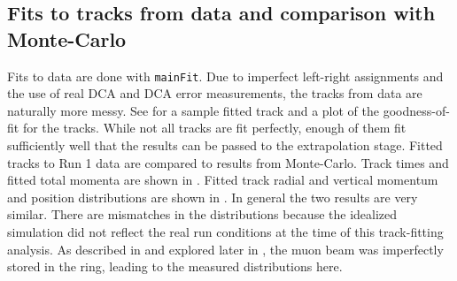 \subsection{Fits to tracks from data and comparison with Monte-Carlo}


Fits to data are done with \texttt{mainFit}. Due to imperfect left-right assignments and the use of real DCA and DCA error measurements, the tracks from data are naturally more messy. See  for a sample fitted track and a plot of the goodness-of-fit for the tracks.  While not all tracks are fit perfectly, enough of them fit sufficiently well that the results can be passed to the extrapolation stage. Fitted tracks to Run 1 data are compared to results from Monte-Carlo. Track times and fitted total momenta are shown in . Fitted track radial and vertical momentum and position distributions are shown in . In general the two results are very similar. There are mismatches in the distributions because the idealized simulation did not reflect the real run conditions at the time of this track-fitting analysis. As described in  and explored later in , the muon beam was imperfectly stored in the ring, leading to the measured distributions here.







